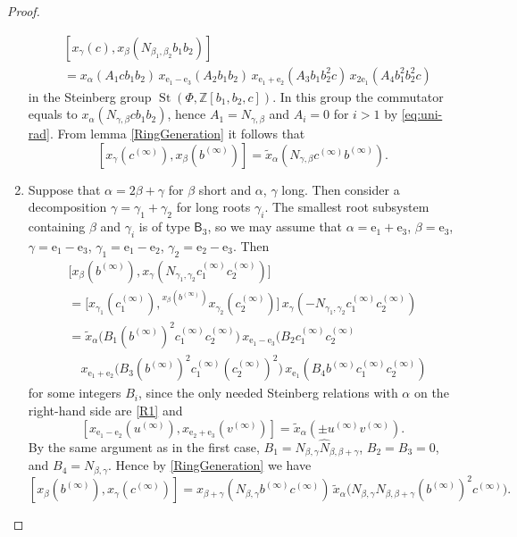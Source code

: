 \documentclass{article}
\numberwithin{equation}{section}
\theoremstyle{definition}
\theoremstyle{remark}
\DeclareMathOperator\St{St}
\newcommand{\up}[2]{{^{#1}\!{#2}}}
\newcommand{\rB}{\mathsf{B}}
\begin{document}
\begin{proof}
\begin{enumerate}
\begin{align*}
  &[x_\gamma(c), x_\beta(N_{\beta_1, \beta_2} b_1 b_2)]\\
  &= x_\alpha(A_1 c b_1 b_2)\, x_{\mathrm e_1 - \mathrm e_3}(A_2 b_1 b_2)\, x_{\mathrm e_1 + \mathrm e_2}(A_3 b_1 b_2^2 c)\, x_{2 \mathrm e_1}(A_4 b_1^2 b_2^2 c)
 \end{align*}
 in the Steinberg group \(\St(\Phi, \mathbb Z[b_1, b_2, c])\). In this group the commutator equals to \(x_\alpha(N_{\gamma, \beta} c b_1 b_2)\), hence \(A_1 = N_{\gamma, \beta}\) and \(A_i = 0\) for \(i > 1\) by \eqref{eq:uni-rad}. From lemma \ref{RingGeneration} it follows that
 \[[x_\gamma(c^{(\infty)}), x_\beta(b^{(\infty)})] = 
 \widetilde x_\alpha(N_{\gamma, \beta} c^{(\infty)} b^{(\infty)}).\]

 \item Suppose that \(\alpha = 2\beta + \gamma\) for \(\beta\) short and \(\alpha\), \(\gamma\) long. Then consider a decomposition \(\gamma = \gamma_1 + \gamma_2\) for long roots \(\gamma_i\). The smallest root subsystem containing \(\beta\) and \(\gamma_i\) is of type \(\rB_3\), so we may assume that \(\alpha = \mathrm e_1 + \mathrm e_3\), \(\beta = \mathrm e_3\), \(\gamma = \mathrm e_1 - \mathrm e_3\), \(\gamma_1 = \mathrm e_1 - \mathrm e_2\), \(\gamma_2 = \mathrm e_2 - \mathrm e_3\). Then
 \begin{align*}
  &\bigl[x_\beta(b^{(\infty)}),
   x_\gamma(N_{\gamma_1, \gamma_2} c_1^{(\infty)} c_2^{(\infty)})\bigr]\\
  &= \bigl[x_{\gamma_1}(c_1^{(\infty)}),
  \up{x_\beta(b^{(\infty)})}
   {x_{\gamma_2}(c_2^{(\infty)})}\bigr]\,
  x_\gamma(-N_{\gamma_1, \gamma_2} c_1^{(\infty)} c_2^{(\infty)})\\
  &= \widetilde x_\alpha\bigl(B_1 (b^{(\infty)})^2 c_1^{(\infty)} c_2^{(\infty)}\bigr)\,
  x_{\mathrm e_1 - \mathrm e_3}(B_2 c_1^{(\infty)} c_2^{(\infty)}\\
  &\quad x_{\mathrm e_1 + \mathrm e_2}\bigl(B_3 (b^{(\infty)})^2 c_1^{(\infty)} (c_2^{(\infty)})^2\bigr)\,
  x_{\mathrm e_1}(B_4 b^{(\infty)} c_1^{(\infty)} c_2^{(\infty)})
 \end{align*}
 for some integers \(B_i\), since the only needed Steinberg relations with \(\alpha\) on the right-hand side are \eqref{R1} and
 \[[x_{\mathrm e_1 - \mathrm e_2}(u^{(\infty)}), x_{\mathrm e_2 + \mathrm e_3}(v^{(\infty)})] = \widetilde x_\alpha(\pm u^{(\infty)} v^{(\infty)}).\]
 By the same argument as in the first case, \(B_1 = N_{\beta, \gamma} \widehat N_{\beta, \beta + \gamma}\), \(B_2 = B_3 = 0\), and \(B_4 = N_{\beta, \gamma}\). Hence by \cref{RingGeneration} we have
 \[[x_\beta(b^{(\infty)}), x_\gamma(c^{(\infty)})]
 = x_{\beta + \gamma}(N_{\beta, \gamma} b^{(\infty)} c^{(\infty)})\,
 \widetilde x_\alpha\bigl(N_{\beta, \gamma} \widehat N_{\beta, \beta + \gamma} (b^{(\infty)})^2 c^{(\infty)}\bigr).\]


\end{enumerate}
\end{proof}
\end{document}
